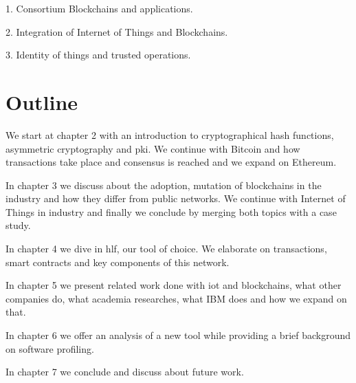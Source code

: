 1. Consortium Blockchains and applications.

2. Integration of Internet of Things and Blockchains.

3. Identity of things and trusted operations.



\section{Outline}

We start at chapter 2 with an introduction to cryptographical hash functions, asymmetric cryptography and \acrfull{pki}. We continue with Bitcoin and how transactions take place and consensus is reached and we expand on Ethereum. 

In chapter 3 we discuss about the adoption, mutation of blockchains in the industry and how they differ from public networks. We continue with Internet of Things in industry and finally we conclude by merging both topics with a case study.

In chapter 4 we dive in \acrlong{hlf}, our tool of choice. We elaborate on transactions, smart contracts and key components of this network. 

In chapter 5 we present related work done with \acrshort{iot} and blockchains, what other companies do, what academia researches, what IBM does and how we expand on that.

In chapter 6 we offer an analysis of a new tool while providing a brief background on software profiling. 

In chapter 7 we conclude and discuss about future work.